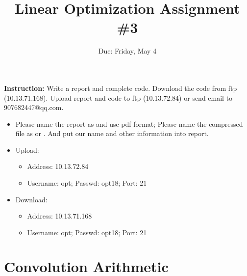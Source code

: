 \documentclass[12pt]{article}
\title{\textbf{Linear Optimization Assignment \#3}}
\author{Due: Friday, May 4}
\date{}
\newcommand{\red}[1]{{\color{red}{#1}}}
\providecommand{\tightlist}{%
	\setlength{\itemsep}{0pt}\setlength{\parskip}{0pt}}
\begin{document}
\maketitle

\textbf{\color{NavyBlue}Instruction:} Write a report and complete code.
Download the code from ftp (10.13.71.168). Upload report and code to ftp (10.13.72.84) or send email to 907682447@qq.com.
\begin{itemize}
	\tightlist
	\item {Please} name the report as \red{hw3\_31xxxxxxxx.pdf} and use pdf format; {Please} name the compressed file as \red{hw3\_31xxxxxxxx.zip} or \red{hw3\_31xxxxxxxx.rar}. And put our name and other information into report.
	\item Upload:
	      \begin{itemize}
		      \tightlist
		      \item    Address: 10.13.72.84
		      \item Username: opt; Passwd:  opt18; Port: 21
	      \end{itemize}
	\item Download:
	      \begin{itemize}
		      \tightlist
		      \item Address: 10.13.71.168
		      \item  Username: opt; Passwd:  opt18; Port: 21
	      \end{itemize}
\end{itemize}

\section{Convolution Arithmetic}
\end{document}
